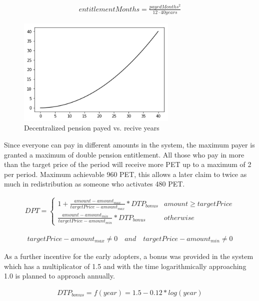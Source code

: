 \begin{eqnarray}
	entitlementMonths = \frac{payedMonths^2}{12 \cdot 40 years}
\end{eqnarray}

\begin{figure}[H]
    \centering
    \includegraphics[width=3.0in]{img/pension_years.png}
    \caption{Decentralized pension payed vs. recive years}
    \label{fig:pension_years}
\end{figure}

Since everyone can pay in different amounts in the system, the maximum payer is granted a maximum of double pension entitlement. All those who pay in more than the target price of the period will receive more PET up to a maximum of 2 per period. Maximum achievable 960 PET, this allows a later claim to twice as much in redistribution as someone who activates 480 PET.

\begin{eqnarray}
	DPT = \begin{cases} 1 + \frac{amount-amount_{max}}
	{targetPrice - amount_{max}} 
	* DTP_{bonus} & amount \geq targetPrice\\
	\frac{amount - amount_{min}}
	{targetPrice - amount_{min}} 
	* DTP_{bonus} & otherwise\end{cases}
\end{eqnarray}

\begin{eqnarray}
targetPrice - amount_{max} \neq 0 \quad and \quad targetPrice - amount_{min} \neq 0
\end{eqnarray}

As a further incentive for the early adopters, a bonus was provided in the system which has a multiplicator of 1.5 and with the time logarithmically approaching 1.0 is planned to approach annually.

\begin{eqnarray}
	DTP_{bonus} = f(year) = 1.5-0.12 * log(year)
\end{eqnarray}

